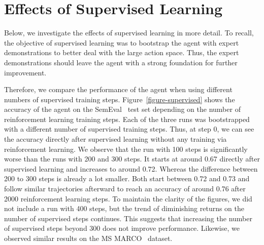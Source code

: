 \section{Effects of Supervised Learning}
\label{sec:evaluation-supervised}

Below, we investigate the effects of supervised learning in more detail. To recall, the 
objective of supervised learning was to bootstrap the agent with expert demonstrations to 
better deal with the large action space. Thus, the expert demonstrations should 
leave the agent with a strong foundation for further improvement.

Therefore, we compare the performance of the agent when using different numbers of supervised 
training steps. Figure~\ref{figure-supervised} shows the accuracy of the agent on the SemEval~\cite{SharpCausalQAEmbeddings2016} test set
depending on the number of reinforcement learning training steps. Each of the three runs was 
bootstrapped with a different number of supervised training steps. Thus, at step 0, we can see the accuracy 
directly after supervised learning without any training via reinforcement learning.
We observe that the run with 100 steps is significantly worse than the runs with 200 and 300 steps.
It starts at around 0.67 directly after supervised learning and increases to around 0.72.
Whereas the difference between 200 to 300 steps is already a lot smaller. Both start between 0.72 and 0.73 and follow 
similar trajectories afterward to reach an accuracy of around 0.76 after 2000 reinforcement learning steps.
To maintain the clarity of the figures, we did not include a run with 400 steps, but the trend of diminishing returns 
on the number of supervised steps continues. 
This suggests that increasing the number of supervised steps beyond 300 does not improve performance.
Likewise, we observed similar results on the MS MARCO~\cite{Nguyen2016MSMARCO} dataset.

